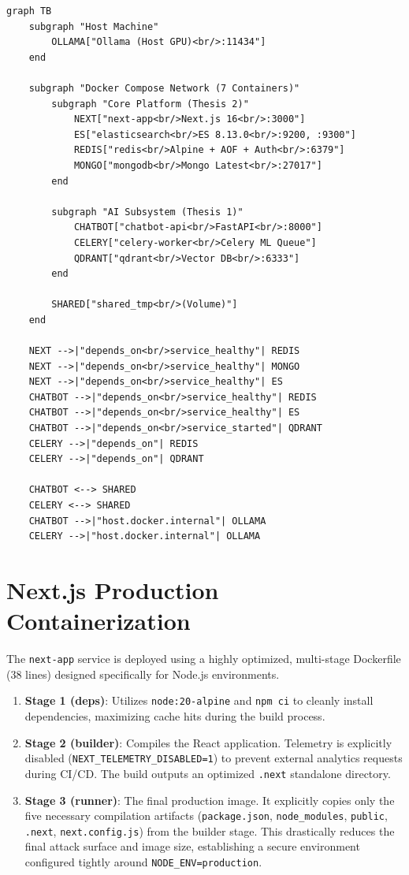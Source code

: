 \begin{verbatim}
graph TB
    subgraph "Host Machine"
        OLLAMA["Ollama (Host GPU)<br/>:11434"]
    end

    subgraph "Docker Compose Network (7 Containers)"
        subgraph "Core Platform (Thesis 2)"
            NEXT["next-app<br/>Next.js 16<br/>:3000"]
            ES["elasticsearch<br/>ES 8.13.0<br/>:9200, :9300"]
            REDIS["redis<br/>Alpine + AOF + Auth<br/>:6379"]
            MONGO["mongodb<br/>Mongo Latest<br/>:27017"]
        end

        subgraph "AI Subsystem (Thesis 1)"
            CHATBOT["chatbot-api<br/>FastAPI<br/>:8000"]
            CELERY["celery-worker<br/>Celery ML Queue"]
            QDRANT["qdrant<br/>Vector DB<br/>:6333"]
        end

        SHARED["shared_tmp<br/>(Volume)"]
    end

    NEXT -->|"depends_on<br/>service_healthy"| REDIS
    NEXT -->|"depends_on<br/>service_healthy"| MONGO
    NEXT -->|"depends_on<br/>service_healthy"| ES
    CHATBOT -->|"depends_on<br/>service_healthy"| REDIS
    CHATBOT -->|"depends_on<br/>service_healthy"| ES
    CHATBOT -->|"depends_on<br/>service_started"| QDRANT
    CELERY -->|"depends_on"| REDIS
    CELERY -->|"depends_on"| QDRANT

    CHATBOT <--> SHARED
    CELERY <--> SHARED
    CHATBOT -->|"host.docker.internal"| OLLAMA
    CELERY -->|"host.docker.internal"| OLLAMA
\end{verbatim}

\section{Next.js Production Containerization}
The \texttt{next-app} service is deployed using a highly optimized, multi-stage Dockerfile (38 lines) designed specifically for Node.js environments.

\begin{enumerate}
\item \textbf{Stage 1 (deps)}: Utilizes \texttt{node:20-alpine} and \texttt{npm ci} to cleanly install dependencies, maximizing cache hits during the build process.
\item \textbf{Stage 2 (builder)}: Compiles the React application. Telemetry is explicitly disabled (\texttt{NEXT\_TELEMETRY\_DISABLED=1}) to prevent external analytics requests during CI/CD. The build outputs an optimized \texttt{.next} standalone directory.
\item \textbf{Stage 3 (runner)}: The final production image. It explicitly copies only the five necessary compilation artifacts (\texttt{package.json}, \texttt{node\_modules}, \texttt{public}, \texttt{.next}, \texttt{next.config.js}) from the builder stage. This drastically reduces the final attack surface and image size, establishing a secure environment configured tightly around \texttt{NODE\_ENV=production}.
\end{enumerate}


